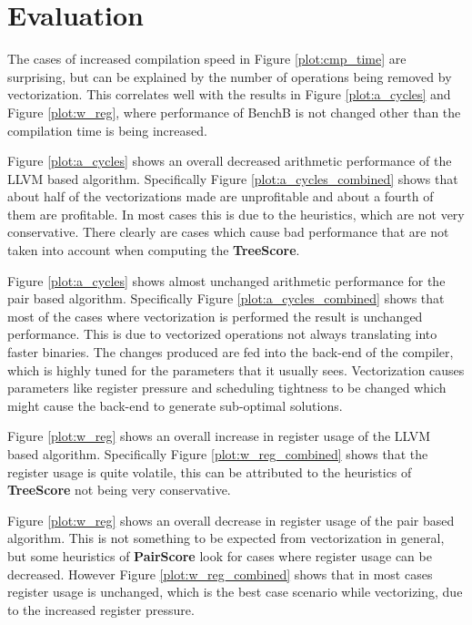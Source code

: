 \documentclass[12pt,a4paper,onecolumn,twoside,openright]{report}
\begin{document}
\section{Evaluation}
\label{sec:eval_comp_speed}
The cases of increased compilation speed in Figure \ref{plot:cmp_time} are surprising, but can be explained by the number of operations being removed by vectorization. This correlates well with the results in Figure \ref{plot:a_cycles} and Figure \ref{plot:w_reg}, where performance of BenchB is not changed other than the compilation time is being increased.

Figure \ref{plot:a_cycles} shows an overall decreased arithmetic performance of the LLVM based algorithm. Specifically Figure \ref{plot:a_cycles_combined} shows that about half of the vectorizations made are unprofitable and about a fourth of them are profitable. In most cases this is due to the heuristics, which are not very conservative. There clearly are cases which cause bad performance that are not taken into account when computing the \textbf{TreeScore}.

Figure \ref{plot:a_cycles} shows almost unchanged arithmetic performance for the pair based algorithm. Specifically Figure \ref{plot:a_cycles_combined} shows that most of the cases where vectorization is performed the result is unchanged performance. This is due to vectorized operations not always translating into faster binaries. The changes produced are fed into the back-end of the compiler, which is highly tuned for the parameters that it usually sees. Vectorization causes parameters like register pressure and scheduling tightness to be changed which might cause the back-end to generate sub-optimal solutions.

Figure \ref{plot:w_reg} shows an overall increase in register usage of the LLVM based algorithm. Specifically Figure \ref{plot:w_reg_combined} shows that the register usage is quite volatile, this can be attributed to the heuristics of \textbf{TreeScore} not being very conservative.

Figure \ref{plot:w_reg} shows an overall decrease in register usage of the pair based algorithm. This is not something to be expected from vectorization in general, but some heuristics of \textbf{PairScore} look for cases where register usage can be decreased. However Figure \ref{plot:w_reg_combined} shows that in most cases register usage is unchanged, which is the best case scenario while vectorizing, due to the increased register pressure.
\end{document}
